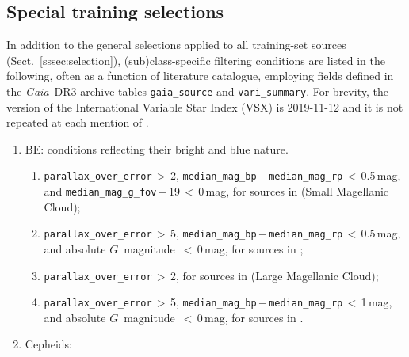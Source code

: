 \documentclass[longauth]{aa}
\def\gdr3{\textit{Gaia}~DR3\xspace}
\def\g{$G$\xspace}
\begin{document}

\begin{acknowledgements}

\end{acknowledgements}



\raggedbottom 



\begin{appendix}

\section{Special training selections\label{app:training}}
In addition to the general selections applied to all training-set sources (Sect.~\ref{sssec:selection}), (sub)class-specific filtering conditions are listed in the following, often as a function of literature catalogue, employing fields defined in the \gdr3 archive tables \texttt{gaia\_source} and \texttt{vari\_summary}. For brevity, the version of the International Variable Star Index (VSX) is 2019-11-12 and it is not repeated at each mention of \citet{2006SASS...25...47W}.
\begin{enumerate}
  \item BE: conditions reflecting their bright and blue nature.
    \begin{enumerate}
         \item \texttt{parallax\_over\_error}\,$>$\,2, \texttt{median\_mag\_bp}\,$-$\,\texttt{median\_mag\_rp}\,$<$\,0.5\,mag, and \texttt{median\_mag\_g\_fov}\,$-$\,19\,$<$\,0\,mag, for sources in \citet{2002A&A...393..887M} (Small Magellanic Cloud);
         \item \texttt{parallax\_over\_error}\,$>$\,5, \texttt{median\_mag\_bp}\,$-$\,\texttt{median\_mag\_rp}\,$<$\,0.5\,mag, and absolute \g~magnitude~$<$\,0\,mag, for sources in \citet{2012ApJS..203...32R};
         \item \texttt{parallax\_over\_error}\,$>$\,2, for sources in \citet{2005MNRAS.361.1055S} (Large Magellanic Cloud);
         \item \texttt{parallax\_over\_error}\,$>$\,5, \texttt{median\_mag\_bp}\,$-$\,\texttt{median\_mag\_rp}\,$<$\,1\,mag, and absolute \g~magnitude~$<$\,0\,mag, for sources in \citet{2006SASS...25...47W}.
   \end{enumerate}
   \item Cepheids:

\end{enumerate}
\end{appendix}
\end{document}
